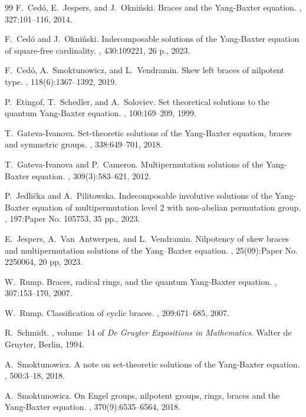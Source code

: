 \documentclass[12pt, a4paper, english]{article}
\theoremstyle{definition}
\begin{document}
\begin{thebibliography}{99}
F.~Ced{\'o}, E.~Jespers, and J.~Okni{\'n}ski.
\newblock Braces and the {Y}ang-{B}axter equation.
, 327:101--116, 2014.

F.~Ced{\'o} and J.~Okni{\'n}ski.
\newblock Indecomposable solutions of the {Y}ang-{B}axter equation of
  square-free cardinality.
, 430:109221, 26 p., 2023.

F.~Ced{\'o}, A.~Smoktunowicz, and L.~Vendramin.
\newblock Skew left braces of nilpotent type.
, 118(6):1367--1392, 2019.

P.~Etingof, T.~Schedler, and A.~Soloviev.
\newblock Set theoretical solutions to the quantum {Y}ang-{B}axter equation.
, 100:169--209, 1999.

T.~Gateva-Ivanova.
\newblock Set-theoretic solutions of the {Y}ang-{B}axter equation, braces and
  symmetric groups.
, 338:649--701, 2018.

T.~Gateva-Ivanova and P.~Cameron.
\newblock Multipermutation solutions of the {Y}ang-{B}axter equation.
, 309(3):583--621, 2012.

P.~Jedli\v{c}ka and A.~Pilitowska.
\newblock Indecomposable involutive solutions of the {Y}ang-{B}axter equation
  of multipermutation level 2 with non-abelian permutation group.
, 197:Paper No. 105753, 35 pp., 2023.

E.~Jespers, A.~Van~Antwerpen, and L.~Vendramin.
\newblock Nilpotency of skew braces and multipermutation solutions of the
  {Y}ang–{B}axter equation.
, 25(09):Paper No. 2250064, 20 pp, 2023.

W.~Rump.
\newblock Braces, radical rings, and the quantum {Y}ang-{B}axter equation.
, 307:153--170, 2007.

W.~Rump.
\newblock Classification of cyclic braces.
, 209:671--685, 2007.

R.~Schmidt.
, volume~14 of {\em De Gruyter
  Expositions in Mathematics}.
\newblock Walter de Gruyter, Berlin, 1994.

A.~Smoktunowicz.
\newblock A note on set-theoretic solutions of the {Y}ang-{B}axter equation.
, 500:3--18, 2018.

A.~Smoktunowicz.
\newblock On {E}ngel groups, nilpotent groups, rings, braces and the
  {Y}ang-{B}axter equation.
, 370(9):6535--6564, 2018.

\end{thebibliography}
\end{document}
